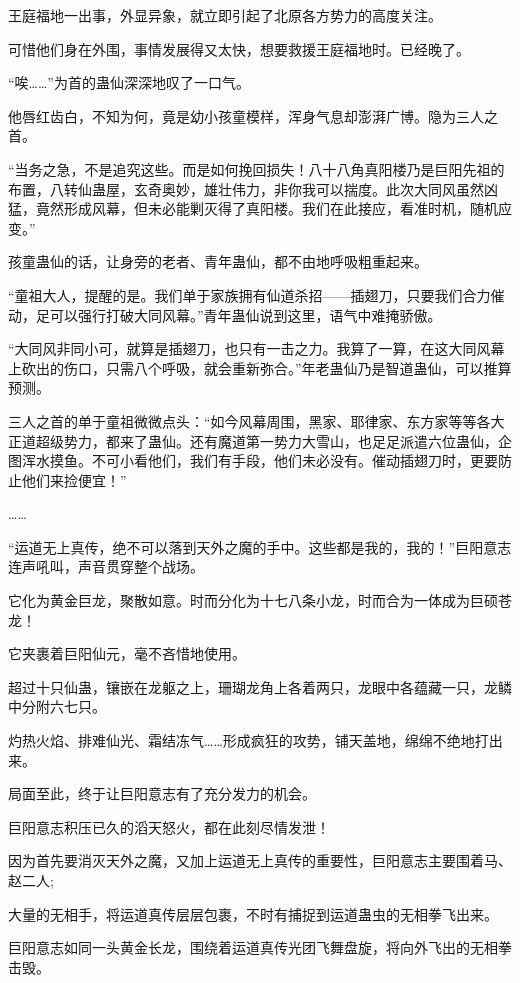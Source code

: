 \begin{this_body}
王庭福地一出事，外显异象，就立即引起了北原各方势力的高度关注。

可惜他们身在外围，事情发展得又太快，想要救援王庭福地时。已经晚了。

“唉……”为首的蛊仙深深地叹了一口气。

他唇红齿白，不知为何，竟是幼小孩童模样，浑身气息却澎湃广博。隐为三人之首。

“当务之急，不是追究这些。而是如何挽回损失！八十八角真阳楼乃是巨阳先祖的布置，八转仙蛊屋，玄奇奥妙，雄壮伟力，非你我可以揣度。此次大同风虽然凶猛，竟然形成风幕，但未必能剿灭得了真阳楼。我们在此接应，看准时机，随机应变。”

孩童蛊仙的话，让身旁的老者、青年蛊仙，都不由地呼吸粗重起来。

“童祖大人，提醒的是。我们单于家族拥有仙道杀招——插翅刀，只要我们合力催动，足可以强行打破大同风幕。”青年蛊仙说到这里，语气中难掩骄傲。

“大同风非同小可，就算是插翅刀，也只有一击之力。我算了一算，在这大同风幕上砍出的伤口，只需八个呼吸，就会重新弥合。”年老蛊仙乃是智道蛊仙，可以推算预测。

三人之首的单于童祖微微点头：“如今风幕周围，黑家、耶律家、东方家等等各大正道超级势力，都来了蛊仙。还有魔道第一势力大雪山，也足足派遣六位蛊仙，企图浑水摸鱼。不可小看他们，我们有手段，他们未必没有。催动插翅刀时，更要防止他们来捡便宜！”

……

“运道无上真传，绝不可以落到天外之魔的手中。这些都是我的，我的！”巨阳意志连声吼叫，声音贯穿整个战场。

它化为黄金巨龙，聚散如意。时而分化为十七八条小龙，时而合为一体成为巨硕苍龙！

它夹裹着巨阳仙元，毫不吝惜地使用。

超过十只仙蛊，镶嵌在龙躯之上，珊瑚龙角上各着两只，龙眼中各蕴藏一只，龙鳞中分附六七只。

灼热火焰、排难仙光、霜结冻气……形成疯狂的攻势，铺天盖地，绵绵不绝地打出来。

局面至此，终于让巨阳意志有了充分发力的机会。

巨阳意志积压已久的滔天怒火，都在此刻尽情发泄！

因为首先要消灭天外之魔，又加上运道无上真传的重要性，巨阳意志主要围着马、赵二人;

大量的无相手，将运道真传层层包裹，不时有捕捉到运道蛊虫的无相拳飞出来。

巨阳意志如同一头黄金长龙，围绕着运道真传光团飞舞盘旋，将向外飞出的无相拳击毁。


\end{this_body}
